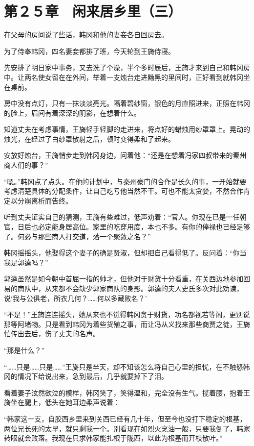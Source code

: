 \section{第２５章　闲来居乡里（三）}

在父母的房间说了些话，韩冈和他的妻妾各自回房去。

为了侍奉韩冈，四名妻妾都排了班，今天轮到王旖侍寝。

先安排了明日家中事务，又去洗了个澡，半个多时辰后，王旖才来到自己和韩冈房中。让两名使女留在在外间，举着一支烛台走进黝黑的里间时，正好看到就韩冈坐在桌前。

房中没有点灯，只有一抹淡淡亮光。隔着碧纱窗，银色的月直照进来，正照在韩冈的脸上，眉间有着深深的阴影，在想着什么。

知道丈夫在考虑事情，王旖轻手轻脚的走进来，将点好的蜡烛用纱罩罩上。晃动的烛光，在经过了白纱罩散射之后，顿时变得柔和了起来。

安放好烛台，王旖悄步走到韩冈身边，问着他：“还是在想着冯家四叔带来的秦州商人们的事？”

“嗯。”韩冈点了点头。在他的计划中，与秦州豪门的合作是长久的事，一开始就要考虑清楚具体的分配条件，让自己吃亏他当然不干。可也不能太贪婪，不然合作肯定以分崩离析而告终。

听到丈夫证实自己的猜测，王旖有些难过，低声劝着：“官人。你现在已是一任朝官，日后也必定能身居高位。家里的吃穿用度，本也不多。有你的俸禄也已经足够了。何必与那些商人打交道，落一个聚敛之名？”

韩冈摇摇头，他娶得这个妻子的确是贤淑，但却把自己看得低了。反问着：“你当我是郭逵吗？”

郭逵虽然是如今朝中首屈一指的帅才，但他对于财货十分看重，在关西边地参加回易的商队中，从来都不会缺少郭家商队的身影。郭逵的夫人史氏多次对此劝谏，说‘我与公俱老，所衣几何？……何以多藏败名？’

“不是！”王旖连连摇头，她从来也不觉得韩冈贪于财货，功名都视若等闲，更别说那等阿堵物。只是看到韩冈为着些货殖之事，而让冯从义找来那些商贾之徒，王旖怕传出去后，伤了丈夫的名声。

“那是什么？”

“……只是……只是……”王旖只是半天，却不知该怎么将自己心里的担忧，在不触怒韩冈的情况下给说出来，急到最后，几乎就要掉下了泪。

看着妻子泫然欲泣的模样，韩冈笑了，笑得温和，完全没有生气。揽着腰，抱着王旖坐在腿上，低头在她耳边柔声说着：

“韩家这一支，自胶西乡里来到关西已经有几十年，但至今也没打下稳定的根基，两位兄长死的太早，就只剩我一个。别看现在如烈火烹油一般，只要我倒了，韩家转眼就会败落。我现在只求韩家能扎根于陇西，以此为根基而开枝散叶。”

